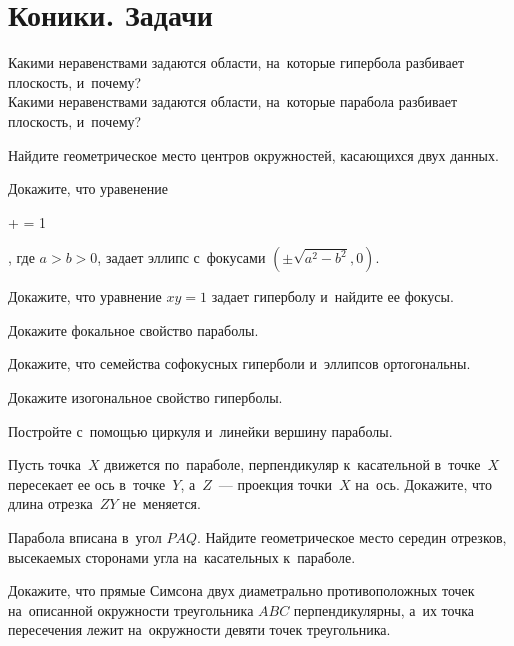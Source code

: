 
\section*{Коники. Задачи}


\begin{problems}

\item
\subproblem
Какими неравенствами задаются области, на~которые гипербола разбивает
плоскость, и~почему?
\\
\subproblem
Какими неравенствами задаются области, на~которые парабола разбивает плоскость,
и~почему?

\item
Найдите геометрическое место центров окружностей, касающихся двух данных.

\item
Докажите, что уравенение
\begin{problemeq*} \displaystyle
     +  = 1
\end{problemeq*},
где $a > b > 0$,
задает эллипс с~фокусами $(\pm\sqrt{a^2 - b^2}, 0)$.

\item
Докажите, что уравнение $x y = 1$ задает гиперболу и~найдите ее фокусы.

\item
Докажите фокальное свойство параболы.

\item
Докажите, что семейства софокусных гиперболи и~эллипсов ортогональны.

\item
Докажите изогональное свойство гиперболы.

\item
Постройте с~помощью циркуля и~линейки вершину параболы.

\item
Пусть точка~$X$ движется по~параболе, перпендикуляр к~касательной в~точке~$X$
пересекает ее ось в~точке~$Y$, а~$Z$~--- проекция точки~$X$ на~ось.
Докажите, что длина отрезка~$ZY$ не~меняется.

\item
Парабола вписана в~угол $PAQ$.
Найдите геометрическое место середин отрезков, высекаемых сторонами угла
на~касательных к~параболе.

\item
Докажите, что прямые Симсона двух диаметрально противоположных точек
на~описанной окружности треугольника $ABC$ перпендикулярны, а~их точка
пересечения лежит на~окружности девяти точек треугольника.


\end{problems}
